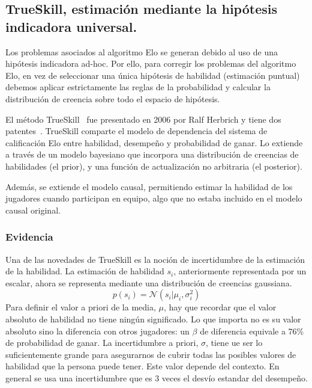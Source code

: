 \documentclass[a4paper,11pt]{book}
\newcommand{\N}{\mathcal{N}}
\theoremstyle{definition}
\begin{document}
\subsection{TrueSkill, estimaci\'on mediante la hip\'otesis indicadora universal.} \label{sec:trueskill}

Los problemas asociados al algoritmo Elo se generan debido al uso de una hip\'otesis indicadora ad-hoc.
%
Por ello, para corregir los problemas del algoritmo Elo, en vez de seleccionar una \'unica hip\'otesis de habilidad (estimaci\'on puntual) debemos aplicar estrictamente las reglas de la probabilidad y calcular la distribuci\'on de creencia sobre todo el espacio de hip\'otesis.


El m\'etodo TrueSkill~\cite{Herbrich2007} fue presentado en 2006 por Ralf Herbrich y tiene dos patentes~\cite{trueskill_patent_06, trueskill_patent_09}.
%
TrueSkill comparte el modelo de dependencia del sistema de calificaci\'on Elo entre habilidad, desempe\~no y probabilidad de ganar.
%
Lo extiende a trav\'es de un modelo bayesiano que incorpora una distribuci\'on de creencias de habilidades (el prior), y una funci\'on de actualizaci\'on no arbitraria (el posterior).


Adem\'as, se extiende el modelo causal, permitiendo estimar la habilidad de los jugadores cuando participan en equipo, algo que no estaba incluido en el modelo causal original.

\subsubsection{Evidencia}

Una de las novedades de TrueSkill es la noci\'on de incertidumbre de la estimaci\'on de la habilidad.
%
La estimaci\'on de habilidad $s_i$, anteriormente representada por un escalar, ahora se representa mediante una distribuci\'on de creencias gaussiana.
%
\begin{equation}
p(s_i) = \N(s_i | \mu_i, \sigma_i^2)
\end{equation}
%
Para definir el valor a priori de la media, $\mu$, hay que recordar que el valor absoluto de habilidad no tiene ning\'un significado.
%
Lo que importa no es su valor absoluto sino la diferencia con otros jugadores: un $\beta$ de diferencia equivale a 76\% de probabilidad de ganar.
%
La incertidumbre a priori, $\sigma$, tiene ue ser lo suficientemente grande para asegurarnos de cubrir todas las posibles valores de habilidad que la persona puede tener.
%
Este valor depende del contexto.
%
En general se usa una incertidumbre que es 3 veces el desv\'io estandar del desempe\~no.
\end{document}
